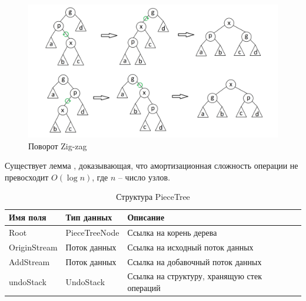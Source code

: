 \documentclass{fefu}
\begin{document}
				\begin{figure}[H]
					\centering
					\includegraphics[width=0.8\linewidth]{images/zigzag.png}
					\caption{Поворот Zig-zag}
					\label{img:zigzag}
				\end{figure}
				\par Существует лемма \cite{SplayTreeArticle}, доказывающая, что 
				амортизационная сложность операции не превосходит $O(\log{n})$, где $n$ -- 
				число узлов.
				\begin{table}[H]
					\centering
					\begin{tabular}{|l|l|p{10cm}|}
						\hline
						\textbf{Имя поля} & \textbf{Тип данных} & \textbf{Описание} \\
						\hline
						Root & PieceTreeNode & Ссылка на корень дерева \\
						\hline
						OriginStream & Поток данных & Ссылка на исходный поток данных \\
						\hline
						AddStream & Поток данных & Ссылка на добавочный поток данных \\
						\hline
						undoStack & UndoStack & Ссылка на структуру, хранящую стек операций \\
						\hline
					\end{tabular}
					\caption{Структура PieceTree}
					\label{table:PieceTree}
				\end{table}
\end{document}
